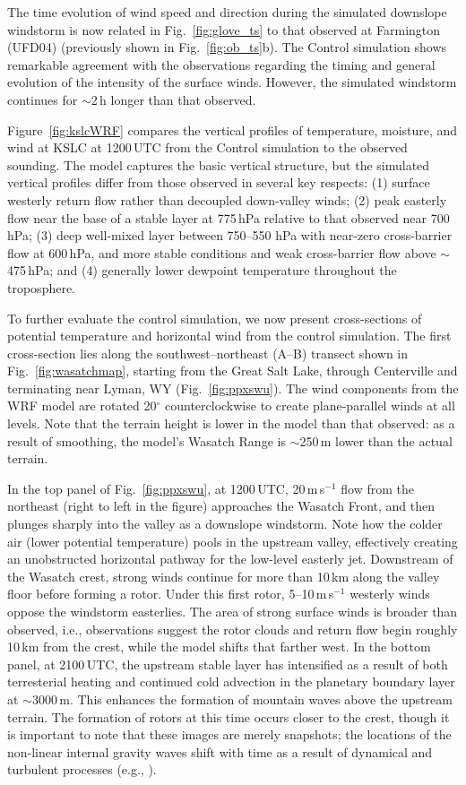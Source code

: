\documentclass[pdftex,12pt]{article}
\def\mps{m\,s$^{-1}$}
\def\degarc{$^{\circ}$} %
\def\around{$\sim$}
\begin{document}
The time evolution of wind speed and direction during the simulated downslope windstorm is now related in Fig.~\ref{fig:glove_ts} to that observed at Farmington (UFD04)  (previously shown in Fig.~\ref{fig:ob_ts}b). The Control simulation shows remarkable agreement with the observations regarding the timing and general evolution of the intensity of the surface winds. However, the simulated windstorm continues for \around 2\,h longer than that observed.

Figure~\ref{fig:kslcWRF} compares the vertical profiles of temperature, moisture, and wind at KSLC at 1200\,UTC from the Control simulation to the observed sounding. The model captures the basic vertical structure, but the simulated vertical profiles differ from those observed in several key respects: (1) surface westerly return flow rather than decoupled down-valley winds; (2) peak easterly flow near the base of a stable layer at 775\,hPa relative to that observed near 700\,hPa; (3) deep well-mixed layer between 750--550 hPa with near-zero cross-barrier flow at 600\,hPa, and more stable conditions and weak cross-barrier flow above \around 475\,hPa; and (4) generally lower dewpoint temperature throughout the troposphere.

To further evaluate the control simulation, we now present cross-sections of potential temperature and horizontal wind from the control simulation. The first cross-section lies along the southwest--northeast (A--B) transect shown in Fig.~\ref{fig:wasatchmap}, starting from the Great Salt Lake, through Centerville and terminating near Lyman, WY (Fig.~\ref{fig:ppxswu}). The wind components from the WRF model are rotated 20\degarc{} counterclockwise to create plane-parallel winds at all levels. Note that the terrain height is lower in the model than that observed: as a result of smoothing, the model's Wasatch Range is \around 250\,m lower than the actual terrain.

In the top panel of Fig.~\ref{fig:ppxswu}, at 1200\,UTC, 20\,\mps{} flow from the northeast (right to left in the figure) approaches the Wasatch Front, and then plunges sharply into the valley as a downslope windstorm. Note how the colder air (lower potential temperature) pools in the upstream valley, effectively creating an unobstructed horizontal pathway for the low-level easterly jet. Downstream of the Wasatch crest, strong winds continue for more than 10\,km along the valley floor before forming a rotor. Under this first rotor, \mbox{5--10\,\mps{}} westerly winds oppose the windstorm easterlies. The area of strong surface winds is broader than observed, i.e., observations suggest the rotor clouds and return flow begin roughly 10\,km from the crest, while the model shifts that farther west. In the bottom panel, at 2100\,UTC, the upstream stable layer has intensified as a result of both terresterial heating and continued cold advection in the planetary boundary layer at \around 3000\,m. This enhances the formation of mountain waves above the upstream terrain. The formation of rotors at this time occurs closer to the crest, though it is important to note that these images are merely snapshots; the locations of the non-linear internal gravity waves shift with time as a result of dynamical and turbulent processes (e.g., \citealt{Hertenstein2009}).
\end{document}

